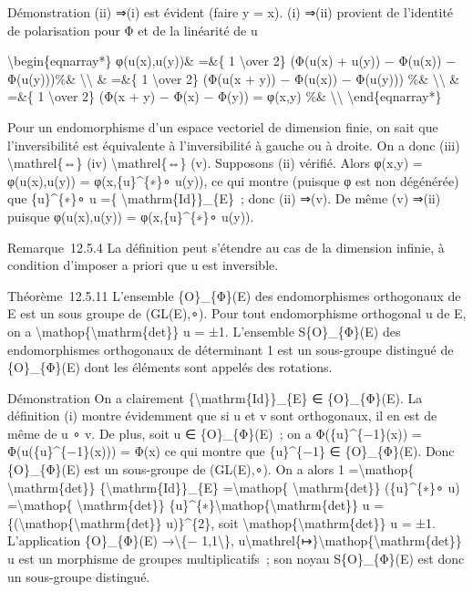 \documentclass[]{article}
\begin{document}
Démonstration (ii) ⇒(i) est évident (faire y = x). (i) ⇒(ii) provient de
l'identité de polarisation pour Φ et de la linéarité de u

\textbackslash{}begin\{eqnarray*\} φ(u(x),u(y))\& =\&\{ 1
\textbackslash{}over 2\} (Φ(u(x) + u(y)) − Φ(u(x)) − Φ(u(y)))\%\&
\textbackslash{}\textbackslash{} \& =\&\{ 1 \textbackslash{}over 2\}
(Φ(u(x + y)) − Φ(u(x)) − Φ(u(y))) \%\& \textbackslash{}\textbackslash{}
\& =\&\{ 1 \textbackslash{}over 2\} (Φ(x + y) − Φ(x) − Φ(y)) = φ(x,y)
\%\& \textbackslash{}\textbackslash{} \textbackslash{}end\{eqnarray*\}

Pour un endomorphisme d'un espace vectoriel de dimension finie, on sait
que l'inversibilité est équivalente à l'inversibilité à gauche ou à
droite. On a donc (iii) \textbackslash{}mathrel\{⇔\} (iv)
\textbackslash{}mathrel\{⇔\} (v). Supposons (ii) vérifié. Alors φ(x,y) =
φ(u(x),u(y)) = φ(x,\{u\}\^{}\{∗\}∘ u(y)), ce qui montre (puisque φ est
non dégénérée) que \{u\}\^{}\{∗\}∘ u =\{
\textbackslash{}mathrm\{Id\}\}\_\{E\}~; donc (ii) ⇒(v). De même (v)
⇒(ii) puisque φ(u(x),u(y)) = φ(x,\{u\}\^{}\{∗\}∘ u(y)).

Remarque~12.5.4 La définition peut s'étendre au cas de la dimension
infinie, à condition d'imposer a priori que u est inversible.

Théorème~12.5.11 L'ensemble \{O\}\_\{Φ\}(E) des endomorphismes
orthogonaux de E est un sous groupe de (GL(E),∘). Pour tout
endomorphisme orthogonal u de E, on a
\textbackslash{}mathop\{\textbackslash{}mathrm\{det\}\} u = ±1.
L'ensemble S\{O\}\_\{Φ\}(E) des endomorphismes orthogonaux de
déterminant 1 est un sous-groupe distingué de \{O\}\_\{Φ\}(E) dont les
éléments sont appelés des rotations.

Démonstration On a clairement \{\textbackslash{}mathrm\{Id\}\}\_\{E\} ∈
\{O\}\_\{Φ\}(E). La définition (i) montre évidemment que si u et v sont
orthogonaux, il en est de même de u ∘ v. De plus, soit u ∈
\{O\}\_\{Φ\}(E)~; on a Φ(\{u\}\^{}\{−1\}(x)) = Φ(u(\{u\}\^{}\{−1\}(x)))
= Φ(x) ce qui montre que \{u\}\^{}\{−1\} ∈ \{O\}\_\{Φ\}(E). Donc
\{O\}\_\{Φ\}(E) est un sous-groupe de (GL(E),∘). On a alors 1
=\textbackslash{}mathop\{ \textbackslash{}mathrm\{det\}\}
\{\textbackslash{}mathrm\{Id\}\}\_\{E\} =\textbackslash{}mathop\{
\textbackslash{}mathrm\{det\}\} (\{u\}\^{}\{∗\}∘ u)
=\textbackslash{}mathop\{ \textbackslash{}mathrm\{det\}\}
\{u\}\^{}\{∗\}\textbackslash{}mathop\{\textbackslash{}mathrm\{det\}\} u
= \{(\textbackslash{}mathop\{\textbackslash{}mathrm\{det\}\}
u)\}\^{}\{2\}, soit
\textbackslash{}mathop\{\textbackslash{}mathrm\{det\}\} u = ±1.
L'application \{O\}\_\{Φ\}(E) →\textbackslash{}\{−
1,1\textbackslash{}\},
u\textbackslash{}mathrel\{↦\}\textbackslash{}mathop\{\textbackslash{}mathrm\{det\}\}
u est un morphisme de groupes multiplicatifs~; son noyau
S\{O\}\_\{Φ\}(E) est donc un sous-groupe distingué.
\end{document}
